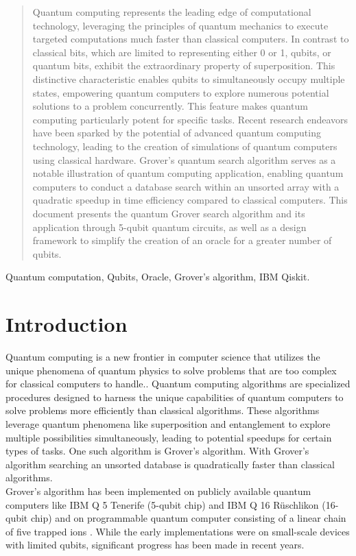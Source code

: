 \documentclass[conference]{IEEEtran}
\begin{document}
\begin{abstract}
	Quantum computing represents the leading edge of
	computational technology, leveraging the principles of quantum
	mechanics to execute targeted computations much faster than
	classical computers. In contrast to classical bits, which are limited
	to representing either 0 or 1, qubits, or quantum bits, exhibit
	the extraordinary property of superposition. This distinctive
	characteristic enables qubits to simultaneously occupy multiple
	states, empowering quantum computers to explore numerous
	potential solutions to a problem concurrently. This feature
	makes quantum computing particularly potent for specific tasks.
	Recent research endeavors have been sparked by the potential
	of advanced quantum computing technology, leading to the
	creation of simulations of quantum computers using classical
	hardware. Grover’s quantum search algorithm serves as a notable
	illustration of quantum computing application, enabling quantum
	computers to conduct a database search within an unsorted array
	with a quadratic speedup in time efficiency compared to classical
	computers. This document presents the quantum Grover search
	algorithm and its application through 5-qubit quantum circuits,
	as well as a design framework to simplify the creation of an
	oracle for a greater number of qubits.
\end{abstract}

\begin{IEEEkeywords}
	Quantum computation, Qubits, Oracle, Grover’s
	algorithm, IBM Qiskit.
\end{IEEEkeywords}

\section{Introduction}
Quantum computing is a new frontier in computer science that utilizes the unique phenomena of quantum physics to solve problems that are too complex for classical computers to handle.\cite{b0}. Quantum computing algorithms are specialized procedures designed to harness the unique capabilities of quantum computers to solve problems more efficiently than classical algorithms. These algorithms leverage quantum phenomena like superposition and entanglement to explore multiple possibilities simultaneously, leading to potential speedups for certain types of tasks. One such algorithm is Grover's algorithm\cite{b1}. With Grover's algorithm searching an unsorted database is quadratically faster than classical algorithms.
\\
Grover's algorithm has been implemented on publicly available quantum computers like IBM Q 5 Tenerife (5-qubit chip) and IBM Q 16 Rüschlikon (16-qubit chip) \cite{b2} and on programmable quantum computer consisting of a
linear chain of five trapped ions \cite{b3} . While the early implementations were on small-scale devices with limited qubits, significant progress has been made in recent years.
\end{document}
